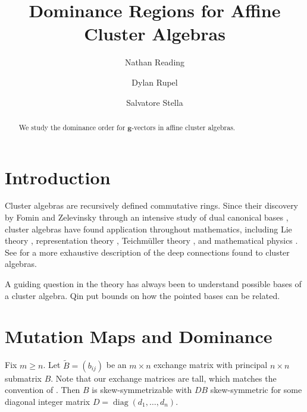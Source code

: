 \documentclass{amsart}
\title{Dominance Regions for Affine Cluster Algebras}
\author{Nathan Reading}
\author{Dylan Rupel}
\author{Salvatore Stella}
\numberwithin{theorem}{section}
\newcommand{\bfg}{\boldsymbol{g}}
\newcommand{\diag}{\operatorname{diag}}
\begin{document}
  \begin{abstract}
    We study the dominance order for $\bfg$-vectors in affine cluster algebras.
  \end{abstract}
  \maketitle

  \section{Introduction}
  Cluster algebras are recursively defined commutative rings.
  Since their discovery by Fomin and Zelevinsky through an intensive study of dual canonical bases \cite{...}, cluster algebras have found application throughout mathematics, including Lie theory \cite{...}, representation theory \cite{...}, Teichm\"uller theory \cite{...}, and mathematical physics \cite{...}.
  See \cite{...} for a more exhaustive description of the deep connections found to cluster algebras.

  A guiding question in the theory has always been to understand possible bases of a cluster algebra.
  Qin put bounds on how the pointed bases can be related.
  


  \section{Mutation Maps and Dominance}
  Fix $m\ge n$.
  Let $\widetilde B=(b_{ij})$ be an $m\times n$ exchange matrix with principal $n\times n$ submatrix $B$.
  Note that our exchange matrices are tall, which matches the convention of \cite{qin}.
  Then $B$ is skew-symmetrizable with $DB$ skew-symmetric for some diagonal integer matrix $D=\diag(d_1,\ldots,d_n)$.
 
\end{document}
